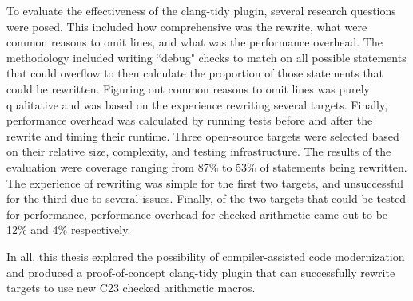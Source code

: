 To evaluate the effectiveness of the clang-tidy plugin, several research questions were posed. This included how comprehensive was the rewrite, what were common reasons to omit lines, and what was the performance overhead. The methodology included writing ``debug" checks to match on all possible statements that could overflow to then calculate the proportion of those statements that could be rewritten. Figuring out common reasons to omit lines was purely qualitative and was based on the experience rewriting several targets. Finally, performance overhead was calculated by running tests before and after the rewrite and timing their runtime. Three open-source targets were selected based on their relative size, complexity, and testing infrastructure. The results of the evaluation were coverage ranging from 87\% to 53\% of statements being rewritten. The experience of rewriting was simple for the first two targets, and unsuccessful for the third due to several issues. Finally, of the two targets that could be tested for performance, performance overhead for checked arithmetic came out to be 12\% and 4\% respectively.

In all, this thesis explored the possibility of compiler-assisted code modernization and produced a proof-of-concept clang-tidy plugin that can successfully rewrite targets to use new C23 checked arithmetic macros.